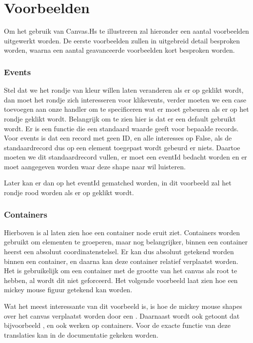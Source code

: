 \section{Voorbeelden}
Om het gebruik van Canvas.Hs te illustreren zal hieronder een aantal voorbeelden uitgewerkt worden. De eerste voorbeelden zullen in uitgebreid detail besproken worden, waarna een aantal geavanceerde voorbeelden kort besproken worden.

\subsubsection{Events}
Stel dat we het rondje van kleur willen laten veranderen als er op geklikt wordt, dan moet het rondje zich interesseren voor klikevents, verder moeten we een case toevoegen aan onze handler om te specificeren wat er moet gebeuren als er op het rondje geklikt wordt. Belangrijk om te zien hier is dat er een default gebruikt wordt. Er is een functie die een standaard waarde geeft voor bepaalde records. Voor events is dat een record met geen ID, en alle interesses op False, als de standaardrecord dus op een element toegepast wordt gebeurd er niets. Daartoe moeten we dit standaardrecord vullen, er moet een eventId bedacht worden en er moet aangegeven worden waar deze shape naar wil luisteren.

Later kan er dan op het eventId gematched worden, in dit voorbeeld zal het rondje rood worden als er op geklikt wordt.



\subsubsection{Containers}
Hierboven is al laten zien hoe een container node eruit ziet. Containers worden gebruikt om elementen te groeperen, maar nog belangrijker, binnen een container heerst een absoluut coordinatenstelsel. Er kan dus absoluut getekend worden binnen een container, en daarna kan deze container relatief verplaatst worden. Het is gebruikelijk om een container met de grootte van het canvas als root te hebben, al wordt dit niet geforceerd. Het volgende voorbeeld laat zien hoe een mickey mouse figuur getekend kan worden.



Wat het meest interessante van dit voorbeeld is, is hoe de mickey mouse shapes over het canvas verplaatst worden door een . Daarnaast wordt ook getoont dat bijvoorbeeld ,  en  ook werken op containers. Voor de exacte functie van deze translaties kan in de documentatie gekeken worden. 

